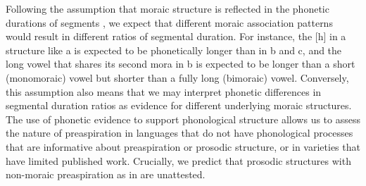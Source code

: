 \documentclass[output=paper,colorlinks,citecolor=brown]{langscibook}
\begin{document}
Following the assumption that moraic structure is reflected in the phonetic durations of segments \citep{broselowetal1997}, we expect that different moraic association patterns would result in different ratios of segmental duration. For instance, the [h] in a structure like a is expected to be phonetically longer than in b and c, and the long vowel that shares its second mora in b is expected to be longer than a short (monomoraic) vowel but shorter than a fully long (bimoraic) vowel. Conversely, this assumption also means that we may interpret phonetic differences in segmental duration ratios as evidence for different underlying moraic structures. The use of phonetic evidence to support phonological structure allows us to assess the nature of preaspiration in languages that do not have phonological processes that are informative about preaspiration or prosodic structure, or in varieties that have limited published work. Crucially, we predict that prosodic structures with non-moraic preaspiration as in  are unattested.
\end{document}
